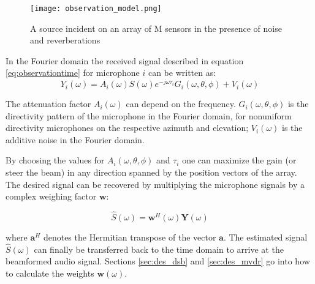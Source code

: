 \begin{figure}[h!]
	\centering  
	\texttt{[image: observation\_model.png]}
	\caption[Room representation for the observational model \cite{ba2007}]{A source incident on an array of M sensors in the presence of noise and reverberations \cite{ba2007}}
	\label{fig:observation}
\end{figure}

In the Fourier domain the received signal described in equation \ref{eq:observationtime} for microphone $i$ can be written as:
\begin{equation}
\label{eq:observationfreq}
Y_{i}(\omega) = A_{i}(\omega)S(\omega)e^{-j\omega\tau_{i}} G_i(\omega,\theta,\phi) + V_{i}(\omega)
\end{equation}



The attenuation factor $A_{i}(\omega)$ can depend on the frequency. $G_i(\omega,\theta,\phi)$ is the directivity pattern of the microphone in the Fourier domain, for nonuniform directivity microphones on the respective azimuth and elevation; $V_{i}(\omega)$ is the additive noise in the Fourier domain.

By choosing the values for $A_{i}(\omega,\theta,\phi)$ and $\tau_{i}$ one can maximize the gain (or steer the beam) in any direction spanned by the position vectors of the array. The desired signal can be recovered by multiplying the microphone signals by a complex weighing factor $\textbf{w}$:

\begin{equation}
\label{eq:bf_est}
\hat{S}(\omega) = \textbf{w}^{H}(\omega)\textbf{Y}(\omega)
\end{equation}


where $\textbf{a}^{H}$ denotes the Hermitian transpose of the vector $\textbf{a}$. The estimated signal $\hat{S}(\omega)$ can finally be transferred back to the time domain to arrive at the beamformed audio signal. Sections \ref{sec:des_dsb} and \ref{sec:des_mvdr} go into how to calculate the weights $\textbf{w}(\omega)$.

